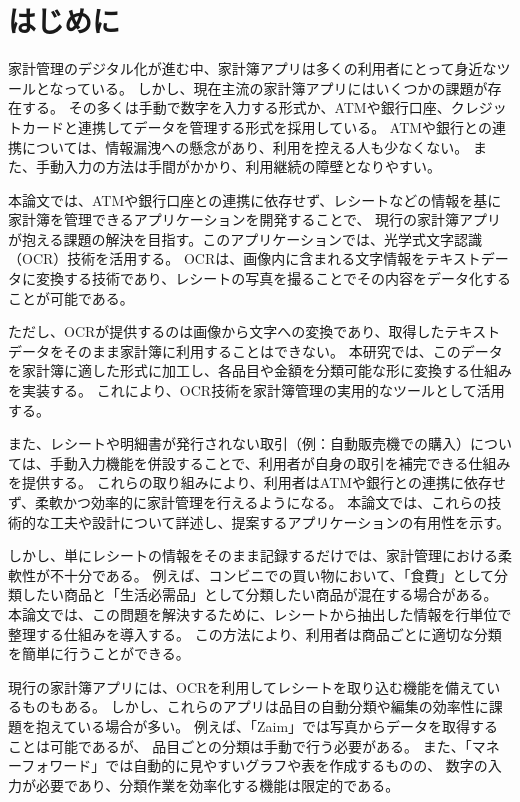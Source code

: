 \documentclass[main]{subfiles}
\begin{document}
\chapter{はじめに}
\label{cha:intro}

家計管理のデジタル化が進む中、家計簿アプリは多くの利用者にとって身近なツールとなっている。
しかし、現在主流の家計簿アプリにはいくつかの課題が存在する。
その多くは手動で数字を入力する形式か、ATMや銀行口座、クレジットカードと連携してデータを管理する形式を採用している。
ATMや銀行との連携については、情報漏洩への懸念があり、利用を控える人も少なくない。
また、手動入力の方法は手間がかかり、利用継続の障壁となりやすい。

本論文では、ATMや銀行口座との連携に依存せず、レシートなどの情報を基に家計簿を管理できるアプリケーションを開発することで、
現行の家計簿アプリが抱える課題の解決を目指す。このアプリケーションでは、光学式文字認識（OCR）技術を活用する。
OCRは、画像内に含まれる文字情報をテキストデータに変換する技術であり、レシートの写真を撮ることでその内容をデータ化することが可能である。

ただし、OCRが提供するのは画像から文字への変換であり、取得したテキストデータをそのまま家計簿に利用することはできない。
本研究では、このデータを家計簿に適した形式に加工し、各品目や金額を分類可能な形に変換する仕組みを実装する。
これにより、OCR技術を家計簿管理の実用的なツールとして活用する。

また、レシートや明細書が発行されない取引（例：自動販売機での購入）については、手動入力機能を併設することで、利用者が自身の取引を補完できる仕組みを提供する。
これらの取り組みにより、利用者はATMや銀行との連携に依存せず、柔軟かつ効率的に家計管理を行えるようになる。
本論文では、これらの技術的な工夫や設計について詳述し、提案するアプリケーションの有用性を示す。


しかし、単にレシートの情報をそのまま記録するだけでは、家計管理における柔軟性が不十分である。
例えば、コンビニでの買い物において、「食費」として分類したい商品と「生活必需品」として分類したい商品が混在する場合がある。
本論文では、この問題を解決するために、レシートから抽出した情報を行単位で整理する仕組みを導入する。
この方法により、利用者は商品ごとに適切な分類を簡単に行うことができる。

現行の家計簿アプリには、OCRを利用してレシートを取り込む機能を備えているものもある。
しかし、これらのアプリは品目の自動分類や編集の効率性に課題を抱えている場合が多い。
例えば、「Zaim」では写真からデータを取得することは可能であるが、
品目ごとの分類は手動で行う必要がある。%
また、「マネーフォワード」では自動的に見やすいグラフや表を作成するものの、
数字の入力が必要であり、分類作業を効率化する機能は限定的である。
\end{document}
